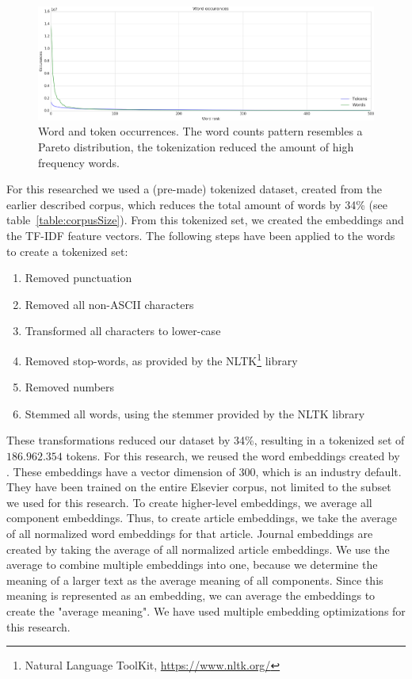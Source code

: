 \documentclass[../../Thesis.tex]{subfiles}
\begin{document}
\FloatBarrier
\begin{figure}[hbt]
\includegraphics[width=6.5in]{Plots/word_occurrences}
\caption{Word and token occurrences. The word counts pattern resembles a Pareto distribution, the tokenization reduced the amount of high frequency words.}\label{figure:wordTokenOccurrence}
\end{figure}
\FloatBarrier
{}
For this researched we used a (pre-made) tokenized dataset, created from the earlier described corpus, which reduces the total amount of words by 34\% (see table~\ref{table:corpusSize}). From this tokenized set, we created the embeddings and the TF-IDF feature vectors.
The following steps have been applied to the words to create a tokenized set:
\begin{enumerate}
\item{Removed punctuation}
\item{Removed all non-ASCII characters}
\item{Transformed all characters to lower-case}
\item{Removed stop-words, as provided by the NLTK\footnote{Natural Language ToolKit, \url{https://www.nltk.org/}} library}
\item{Removed numbers}
\item{Stemmed all words, using the stemmer provided by the NLTK library}
\end{enumerate}
These transformations reduced our dataset by 34\%, resulting in a tokenized set of $186.962.354$ tokens.
For this research, we reused the word embeddings created by \citet{Truong2017Thesis}. These embeddings have a vector dimension of 300, which is an industry default. They have been trained on the entire Elsevier corpus, not limited to the subset we used for this research. To create higher-level embeddings, we average all component embeddings. Thus, to create article embeddings, we take the average of all normalized word embeddings for that article. Journal embeddings are created by taking the average of all normalized article embeddings. We use the average to combine multiple embeddings into one, because we determine the meaning of a larger text as the average meaning of all components. Since this meaning is represented as an embedding, we can average the embeddings to create the "average meaning". We have used multiple embedding optimizations for this research.
\end{document}
